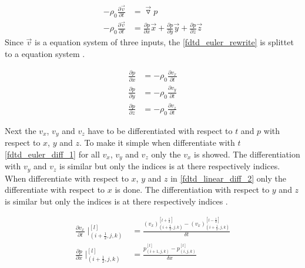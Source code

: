 \begin{subequations}\label{fdtd_euler_rewrite}
\begin{alignat}{2}
-\rho_0 \frac{\partial \vec{v}}{\partial t} &=\vec{\triangledown }p \label{fdtd_euler_rewrite_1}\\
-\rho_0 \frac{\partial \vec{v}}{\partial t} &=\frac{\partial p}{\partial x}\vec{x}+\frac{\partial p}{\partial y}\vec{y}+\frac{\partial p}{\partial z}\vec{z} \label{fdtd_euler_rewrite_2}
\end{alignat}
\end{subequations}
Since $\vec{v}$ is a equation system of three inputs, the \autoref{fdtd_euler_rewrite} is splittet to a equation system \citep{Sakuma2014}.

\begin{subequations}\label{fdtd_euler_rewrite_system}
\begin{alignat}{2}
\frac{\partial p}{\partial x} &=-\rho_0 \frac{\partial v_x}{\partial t} \label{fdtd_euler_rewrite_system_1}\\
\frac{\partial p}{\partial y} &=-\rho_0 \frac{\partial v_y}{\partial t} \label{fdtd_euler_rewrite_system_2}\\
\frac{\partial p}{\partial z} &=-\rho_0 \frac{\partial v_z}{\partial t} \label{fdtd_euler_rewrite_system_3}
\end{alignat}
\end{subequations}


Next the $v_x$, $v_y$ and $v_z$ have to be differentiated with respect to $t$ and $p$ with respect to $x$, $y$ and $z$. To make it simple when differentiate with $t$ \autoref{fdtd_euler_diff_1} for all $v_x$, $v_y$ and $v_z$ only the $v_x$ is showed. The differentiation with $v_y$ and $v_z$ is similar but only the indices is at there respectively indices. When differentiate with respect to $x$, $y$ and $z$ in \autoref{fdtd_linear_diff_2} only the differentiate with respect to $x$ is done. The differentiation with respect to $y$ and $z$ is similar but only the indices is at there respectively indices \citep{Sakuma2014}.



\begin{subequations}\label{fdtd_euler_diff}
\begin{alignat}{2}
\frac{\partial v_x}{\partial t}\mid _{(i+\frac{1}{2},j,k)}^{[l]} &= \frac{(v_x)_{(i+\frac{1}{2},j,k)}^{[l+\frac{1}{2}]} -(v_x)_{(i+\frac{1}{2},j,k)}^{[l-\frac{1}{2}]}}{\delta t} \label{fdtd_euler_diff_1} \\
\frac{\partial p}{\partial x}\mid _{(i+\frac{1}{2},j,k)}^{[l]} &= \frac{p_{(i+1,j,k)}^{[l]} -p_{(i,j,k)}^{[l]}}{\delta x}  \label{fdtd_linear_diff_2}
\end{alignat}
\end{subequations}

